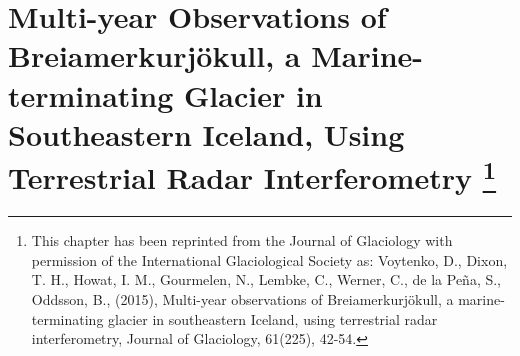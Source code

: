 % 
% 
% 
% 
% 
% 
% 
% 
% 
% 
% 
% 
% 
% 
% 

% 
\chapter[Multi-year Observations of Brei{\dh}amerkurjökull, a Marine-terminating Glacier in Southeastern Iceland, Using Terrestrial Radar Interferometry]{Multi-year Observations of Brei{\dh}amerkurjökull, a Marine-terminating Glacier in Southeastern Iceland, Using Terrestrial Radar Interferometry \footnote{This chapter has been reprinted from the Journal of Glaciology with permission of the International Glaciological Society as: Voytenko, D., Dixon, T. H., Howat, I. M., Gourmelen, N., Lembke, C., Werner, C., de la Peña, S., Oddsson, B., (2015), Multi-year observations of Brei{\dh}amerkurjökull, a marine-terminating glacier in southeastern Iceland, using terrestrial radar interferometry, Journal of Glaciology, 61(225), 42-54.}}


